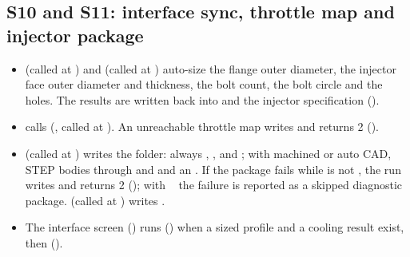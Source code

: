 \subsection{S10 and S11: interface sync, throttle map and injector package}\label{sec:df-s10}
\begin{itemize}
  \item {} (called at ) and  (called at ) auto-size the flange outer diameter, the injector face outer diameter and thickness, the bolt count, the bolt circle and the holes. The results are written back into  and the injector specification ().
  \item {} calls  (, called at ). An unreachable throttle map writes  and returns 2 ().
  \item {} (called at ) writes the  folder: always , ,  and ; with machined or auto CAD, STEP bodies through  and  and an . If the package fails while  is not , the run writes  and returns 2 (); with ~ the failure is reported as a skipped diagnostic package.  (called at ) writes .
  \item The interface screen () runs  () when a sized profile and a cooling result exist, then  ().
\end{itemize}

